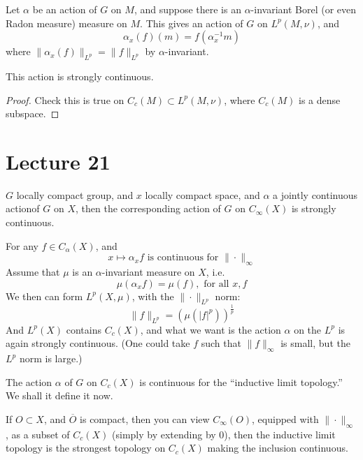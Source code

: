 Let $\alpha$ be an action of $G$ on $M$, and suppose there is an $\alpha$-invariant Borel (or even Radon measure) measure on $M$. This gives an action of $G$ on $L^p(M, \nu)$, and 
\begin{equation*}
    \alpha_x(f)(m)=f(\alpha_x^{-1}m)
\end{equation*}
where $\|\alpha_x(f)\|_{L^p}=\|f\|_{L^p}$ by $\alpha$-invariant.
\begin{proposition}
    This action is strongly continuous.
\end{proposition}
\begin{proof}
    Check this is true on $C_c(M)\subset L^p(M, \nu)$, where $C_c(M)$ is a dense subspace. 
\end{proof}

\section{Lecture 21}
$G$ locally compact group, and $x$ locally compact space, and $\alpha$ a jointly continuous actionof $G$ on $X$, then the corresponding action of $G$ on $C_\infty(X)$ is strongly continuous.

For any $f\in C_\alpha(X)$, and
\begin{equation*}
    x\mapsto \alpha_xf \text{ is continuous for }\|\cdot\|_\infty
\end{equation*}
Assume that $\mu$ is an $\alpha$-invariant measure on $X$, i.e. 
\begin{equation*}
    \mu(\alpha_xf)=\mu(f), \text{ for all } x,f
\end{equation*}
We then can form $L^p(X,\mu)$, with the $\|\cdot\|_{L^p}$ norm:
\begin{equation*}
    \|f\|_{L^p}=\left(\mu(|f|^p)\right)^\frac{1}{p}
\end{equation*}
And $L^p(X)$ contains $C_c(X)$, and what we want is the action $\alpha$ on the $L^p$ is again strongly continuous. (One could take $f$ such that $\|f\|_\infty$ is small, but the $L^p$ norm is large.)

The action $\alpha$ of $G$ on $C_c(X)$ is continuous for the ``inductive limit topology.'' We shall it define it now.

\begin{definition}
    If $O\subset X$, and $\overline{O}$ is compact, then you can view $C_\infty(O)$, equipped with $\|\cdot\|_\infty$, as a subset of $C_c(X)$ (simply by extending by 0), then the inductive limit topology is the strongest topology on $C_c(X)$ making the inclusion continuous.
\end{definition}

